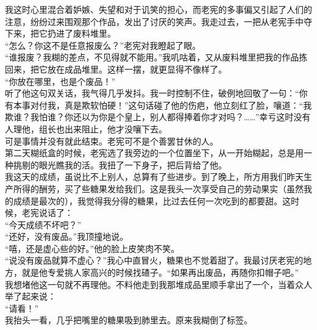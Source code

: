 我这时心里混合着妒嫉、失望和对于讥笑的担心，而老宪的多事偏又引起了人们的注意，纷纷过来围观那个作品，发出了讨厌的笑声。我走过去，一把从老宪手中夺下来，把它扔进了废料堆里。\\

“怎么？你这不是任意报废么？”老宪对我瞪起了眼。\\

“谁报废？我糊的差点，不见得就不能用。”我叽咕着，又从废料堆里把我的作品拣回来，把它放在成品堆里。这样一摆，就更显得不像样了。\\

“你放在哪里，也是个废品！”\\

听了他这句双关话，我气得几乎发抖。我一时控制不住，破例地回敬了一句：“你有本事对付我，真是欺软怕硬！”这句话碰了他的伤疤，他立刻红了脸，嚷道：“我欺谁？我怕谁？你还以为你是个皇上，别人都得捧着你才对吗？……”幸亏这时没有人理他，组长也出来阻止，他才没嚷下去。\\

可是事情并没有就此结束。老宪可不是个善罢甘休的人。\\

第二天糊纸盒的时候，老宪选了我旁边的一个位置坐下，从一开始糊起，总是用一种挑剔的眼光瞧我的活。我扭了一下身子，把后背给了他。\\

我这天的成绩，虽说比不上别人，总算有了些进步。到了晚上，所方用我们昨天生产所得的酬劳，买了些糖果发给我们。这是我头一次享受自己的劳动果实（虽然我的成绩是最次的），我觉得我分得的糖果，比过去任何一次吃到的都要甜。这时候，老宪说话了：\\

“今天成绩不坏吧？”\\

“还好，没有废品。”我顶撞地说。\\

“嘻，还是虚心些的好。”他的脸上皮笑肉不笑。\\

“说没有废品就算不虚心？”我心中直冒火，糖果也不觉着甜了。我最讨厌老宪的地方，就是他专爱挑人家高兴的时候找碴子。“如果再出废品，再随你扣帽子吧。”\\

我想堵他这一句就不再理他。不料他走到我那堆成品里顺手拿出了一个，当着众人举了起来说：\\

“请看！”\\

我抬头一看，几乎把嘴里的糖果吸到肺里去。原来我糊倒了标签。\\

